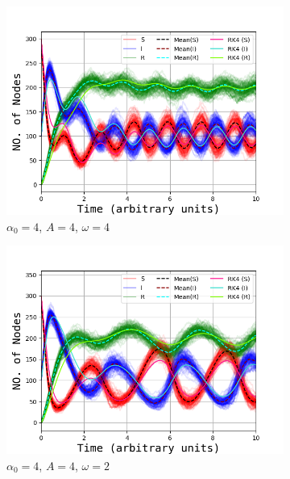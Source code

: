  \begin{figure}[H]
		\centering
		\begin{subfigure}{0.49\linewidth}
			\includegraphics[width=1.1\linewidth]{Figures/OppgC_4_4.png}
			\caption{$\alpha_0 = 4$, $A = 4$, $\omega = 4$}
		\end{subfigure}
		\begin{subfigure}{0.49\linewidth}
			\includegraphics[width=1.1\linewidth]{Figures/OppgC_4_2.png}
			\caption{$\alpha_0 = 4$, $A = 4$, $\omega = 2$}
		\end{subfigure}
		\begin{subfigure}{0.49\linewidth}

\end{subfigure}
\end{figure}
